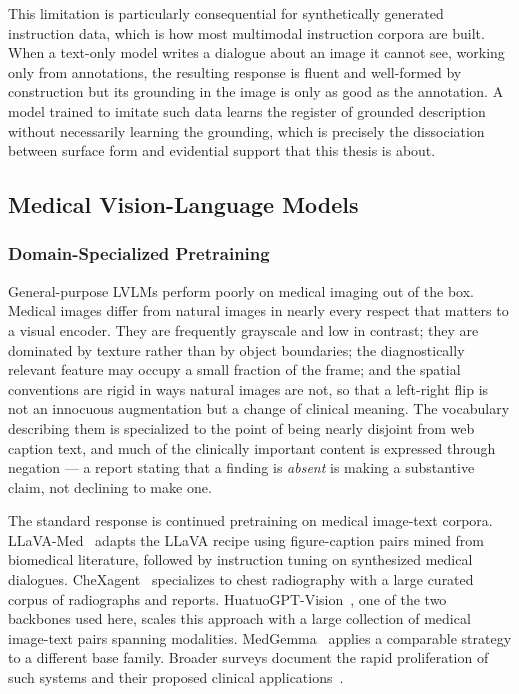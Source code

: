 This limitation is particularly consequential for synthetically generated instruction data, which is how most multimodal instruction corpora are built. When a text-only model writes a dialogue about an image it cannot see, working only from annotations, the resulting response is fluent and well-formed by construction but its grounding in the image is only as good as the annotation. A model trained to imitate such data learns the register of grounded description without necessarily learning the grounding, which is precisely the dissociation between surface form and evidential support that this thesis is about.

\subsection{Medical Vision-Language Models}
\label{sec:bg:medical-lvlm}

\subsubsection{Domain-Specialized Pretraining}

General-purpose LVLMs perform poorly on medical imaging out of the box. Medical images differ from natural images in nearly every respect that matters to a visual encoder. They are frequently grayscale and low in contrast; they are dominated by texture rather than by object boundaries; the diagnostically relevant feature may occupy a small fraction of the frame; and the spatial conventions are rigid in ways natural images are not, so that a left-right flip is not an innocuous augmentation but a change of clinical meaning. The vocabulary describing them is specialized to the point of being nearly disjoint from web caption text, and much of the clinically important content is expressed through negation --- a report stating that a finding is \emph{absent} is making a substantive claim, not declining to make one.

The standard response is continued pretraining on medical image-text corpora. LLaVA-Med~\cite{li2024llavamed} adapts the LLaVA recipe using figure-caption pairs mined from biomedical literature, followed by instruction tuning on synthesized medical dialogues. CheXagent~\cite{chen2024chexagent} specializes to chest radiography with a large curated corpus of radiographs and reports. HuatuoGPT-Vision~\cite{chen2024towards}, one of the two backbones used here, scales this approach with a large collection of medical image-text pairs spanning modalities. MedGemma~\cite{sellergren2025medgemma} applies a comparable strategy to a different base family. Broader surveys document the rapid proliferation of such systems and their proposed clinical applications~\cite{alsaad2024multimodal, saab2024capabilities}.

